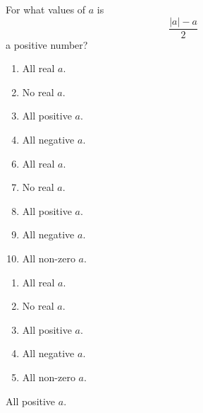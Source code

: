 


 For what values of $a$ is 
\[\frac{|a|-a}{2}\]
a positive number?


\ifsat
	\begin{enumerate}[label=\Alph*)]
		\item   All real $a$.
		\item  No real $a$.
		\item  All positive $a$.%
		\item  All negative $a$.
	\end{enumerate}
\else
\fi

\ifacteven
	\begin{enumerate}[label=\textbf{\Alph*.},itemsep=\fill,align=left]
		\setcounter{enumii}{5}
		\item   All real $a$.
		\item  No real $a$.
		\item  All positive $a$.%
		\addtocounter{enumii}{1}
		\item  All negative $a$.
		\item  All non-zero $a$.
	\end{enumerate}
\else
\fi

\ifactodd
	\begin{enumerate}[label=\textbf{\Alph*.},itemsep=\fill,align=left]
		\item   All real $a$.
		\item  No real $a$.
		\item  All positive $a$.%
		\item  All negative $a$.
		\item  All non-zero $a$.
	\end{enumerate}
\else
\fi

\ifgridin
  All positive $a$.%
		
\else
\fi

